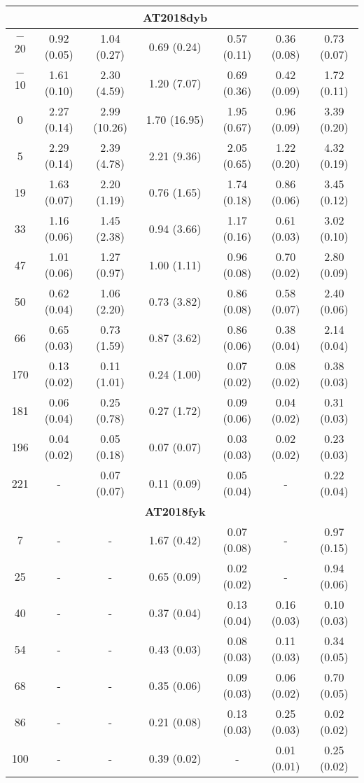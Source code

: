 \documentclass[structabstract]{aa}
\begin{document}
\begin{small}
\begin{longtable}{c c c c c c c}
	&		&		&	\textbf{AT2018dyb}	&		&		&	\\ \hline
$-$20	&	0.92 (0.05)	&	1.04 (0.27)	&	0.69 (0.24)	&	0.57 (0.11)	&	0.36 (0.08)	&	0.73 (0.07)  \\
$-$10	&	1.61 (0.10)	&	2.30 (4.59)	&	1.20 (7.07)	&	0.69 (0.36)	&	0.42 (0.09)	&	1.72 (0.11)  \\
0	&	2.27 (0.14)	&	2.99 (10.26)	&	1.70 (16.95)	&	1.95 (0.67)	&	0.96 (0.09)	&	3.39 (0.20)  \\
5	&	2.29 (0.14)	&	2.39 (4.78)	&	2.21 (9.36)	&	2.05 (0.65)	&	1.22 (0.20)	&	4.32 (0.19)  \\
19	&	1.63 (0.07)	&	2.20 (1.19)	&	0.76 (1.65)	&	1.74 (0.18)	&	0.86 (0.06)	&	3.45 (0.12)  \\
33	&	1.16 (0.06)	&	1.45 (2.38)	&	0.94 (3.66)	&	1.17 (0.16)	&	0.61 (0.03)	&	3.02 (0.10)  \\
47	&	1.01 (0.06)	&	1.27 (0.97)	&	1.00 (1.11)	&	0.96 (0.08)	&	0.70 (0.02)	&	2.80 (0.09)  \\
50	&	0.62 (0.04)	&	1.06 (2.20)	&	0.73 (3.82)	&	0.86 (0.08)	&	0.58 (0.07)	&	2.40 (0.06)  \\
66	&	0.65 (0.03)	&	0.73 (1.59)	&	0.87 (3.62)	&	0.86 (0.06)	&	0.38 (0.04)	&	2.14 (0.04)  \\
170	&	0.13 (0.02)	&	0.11 (1.01)	&	0.24 (1.00)	&	0.07 (0.02)	&	0.08 (0.02)	&	0.38 (0.03)  \\
181	&	0.06 (0.04)	&	0.25 (0.78)	&	0.27 (1.72)	&	0.09 (0.06)	&	0.04 (0.02)	&	0.31 (0.03)  \\
196	&	0.04 (0.02)	&	0.05 (0.18)	&	0.07 (0.07)	&	0.03 (0.03)	&	0.02 (0.02)	&	0.23 (0.03)  \\
221	&	-	&	0.07 (0.07)	&	0.11 (0.09)	&	0.05 (0.04)	&	-	&	0.22 (0.04)  \\ \hline
	&		&		&	\textbf{AT2018fyk}	&		&		&	\\ \hline
7	&	-	&	-	&	1.67 (0.42)	&	0.07 (0.08)	&	-	&	0.97 (0.15)  \\
25	&	-	&	-	&	0.65 (0.09)	&	0.02 (0.02)	&	-	&	0.94 (0.06)  \\
40	&	-	&	-	&	0.37 (0.04)	&	0.13 (0.04)	&	0.16 (0.03)	&	0.10 (0.03)  \\
54	&	-	&	-	&	0.43 (0.03)	&	0.08 (0.03)	&	0.11 (0.03)	&	0.34 (0.05)  \\
68	&	-	&	-	&	0.35 (0.06)	&	0.09 (0.03)	&	0.06 (0.02)	&	0.70 (0.05)  \\
86	&	-	&	-	&	0.21 (0.08)	&	0.13 (0.03)	&	0.25 (0.03)	&	0.02 (0.02)  \\
100	&	-	&	-	&	0.39 (0.02)	&	-	&	0.01 (0.01)	&	0.25 (0.02)  \\ \hline

\end{longtable}
\end{small}
\end{document}
